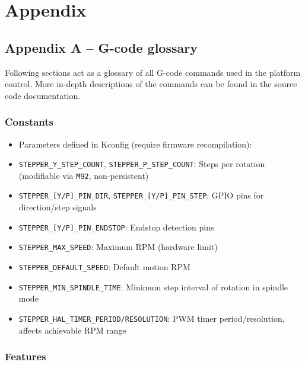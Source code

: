 \chapter*{Appendix}

\section*{Appendix A -- G-code glossary}


Following sections act as a glossary of all G-code commands used in the platform control. More in-depth descriptions of the commands can be found in the source code documentation.

\subsection*{Constants}

\begin{itemize}
  \item Parameters defined in Kconfig (require firmware recompilation):
  \item \texttt{STEPPER\_Y\_STEP\_COUNT}, \texttt{STEPPER\_P\_STEP\_COUNT}: Steps per rotation (modifiable via \texttt{M92}, non-persistent)
  \item \texttt{STEPPER\_[Y/P]\_PIN\_DIR}, \texttt{STEPPER\_[Y/P]\_PIN\_STEP}: GPIO pins for direction/step signals
  \item \texttt{STEPPER\_[Y/P]\_PIN\_ENDSTOP}: Endstop detection pins
  \item \texttt{STEPPER\_MAX\_SPEED}: Maximum RPM (hardware limit)
  \item \texttt{STEPPER\_DEFAULT\_SPEED}: Default motion RPM
  \item \texttt{STEPPER\_MIN\_SPINDLE\_TIME}: Minimum step interval of rotation in spindle mode
  \item \texttt{STEPPER\_HAL\_TIMER\_PERIOD/RESOLUTION}: PWM timer period/resolution, affects achievable RPM range
\end{itemize}

\subsection*{Features}

